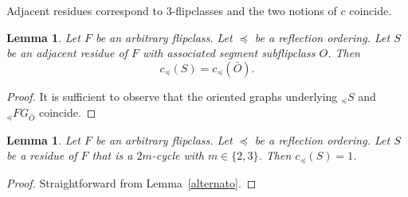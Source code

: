 \documentclass[12pt,reqno]{amsart}
\theoremstyle{plain}
\newtheorem{lem}[thm]{Lemma}
\theoremstyle{definition}
\theoremstyle{remark}
\begin{document}
Adjacent residues correspond to $3$-flipclasses and the two notions of $c$ coincide.
\begin{lem}
\label{corrispondeS}
Let $F$ be an arbitrary flipclass. Let $\preceq$ be a reflection ordering.  Let $S$ be an adjacent residue of  $F$ with associated segment subflipclass $O$. Then 
$$c_{\preceq}(S)=c_{\preceq}(\bar{O}).$$
\end{lem}
\begin{proof}
It is sufficient to observe that the oriented graphs underlying $_{\preceq}S$ and $_{\preceq}FG_{\bar{O}}$ coincide. 
\end{proof}

\begin{lem}
\label{2-3}
Let $F$ be an arbitrary flipclass. Let $\preceq$ be a reflection ordering.
Let $S$ be a residue of $F$ that is a $2m$-cycle with $m\in \{2,3\}$. Then $c_{\preceq}(S)=1$.
\end{lem}
\begin{proof}
Straightforward from Lemma~\ref{alternato}.
\end{proof}
\end{document}
